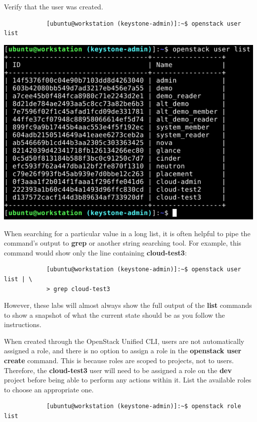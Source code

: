 \documentclass[letterpaper, 12pt]{article}
\begin{document}
\begin{enumerate}
    \begin{labstep}
        Verify that the user was created.
        \begin{lstlisting}
            [ubuntu@workstation (keystone-admin)]:~$ openstack user list
        \end{lstlisting}

        \begin{center}
            \includegraphics[width=\linewidth]{images/part4/step7.png}
        \end{center}
    \end{labstep}

    \begin{tipbox}
        When searching for a particular value in a long list, it is often helpful to pipe the command's output to \textbf{grep} or another string searching tool.
        For example, this command would show only the line containing \textbf{cloud-test3}:
        \begin{lstlisting}
            [ubuntu@workstation (keystone-admin)]:~$ openstack user list | \
            > grep cloud-test3
        \end{lstlisting}
        However, these labs will almost always show the full output of the \textbf{list} commands to show a snapshot of what the current state should be as you follow the instructions.
    \end{tipbox}

    \begin{labstep}

        When created through the OpenStack Unified CLI, users are not automatically assigned a role, and there is no option to assign a role in the \textbf{openstack user create} command.
        This is because roles are scoped to projects, not to users.
        Therefore, the \textbf{cloud-test3} user will need to be assigned a role on the \textbf{dev} project before being able to perform any actions within it.
        List the available roles to choose an appropriate one.
        \begin{lstlisting}
            [ubuntu@workstation (keystone-admin)]:~$ openstack role list
        \end{lstlisting}


\end{labstep}
\end{enumerate}
\end{document}
